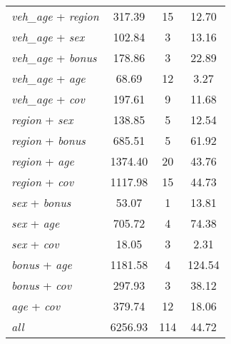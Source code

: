 {\begin{ThreePartTable}
\begin{longtable}{lccc}
    \textit{veh\_age} + \textit{region} &   317.39 &       15 &    12.70 \\
    \textit{veh\_age} + \textit{sex} &   102.84 &        3 &    13.16 \\
    \textit{veh\_age} + \textit{bonus} &   178.86 &        3 &    22.89 \\
    \textit{veh\_age} + \textit{age} &    68.69 &       12 &     3.27 \\
    \textit{veh\_age} + \textit{cov} &   197.61 &        9 &    11.68 \\
    \textit{region} + \textit{sex} &   138.85 &        5 &    12.54 \\
    \textit{region} + \textit{bonus} &   685.51 &        5 &    61.92 \\
    \textit{region} + \textit{age} &  1374.40 &       20 &    43.76 \\
    \textit{region} + \textit{cov} &  1117.98 &       15 &    44.73 \\
    \textit{sex} + \textit{bonus} &    53.07 &        1 &    13.81 \\
    \textit{sex} + \textit{age} &   705.72 &        4 &    74.38 \\
    \textit{sex} + \textit{cov} &    18.05 &        3 &     2.31 \\
    \textit{bonus} + \textit{age} &  1181.58 &        4 &   124.54 \\
    \textit{bonus} + \textit{cov} &   297.93 &        3 &    38.12 \\
    \textit{age} + \textit{cov} &   379.74 &       12 &    18.06 \\
    \textit{all}\tnote{\ddag} &  6256.93 &      114 &    44.72 \\

\end{longtable}
\end{ThreePartTable}
}
